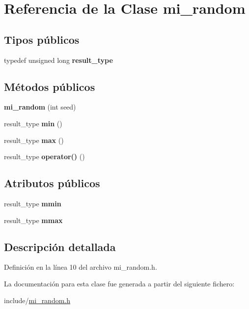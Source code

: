 \hypertarget{classmi__random}{}\section{Referencia de la Clase mi\+\_\+random}
\label{classmi__random}
\subsection*{Tipos públicos}
\begin{DoxyCompactItemize}
\item 
\mbox{\label{classmi__random_a6aea707ebdebf4c974b66185d72d4a1c}} 
typedef unsigned long {\bfseries result\+\_\+type}
\end{DoxyCompactItemize}
\subsection*{Métodos públicos}
\begin{DoxyCompactItemize}
\item 
\mbox{\label{classmi__random_ab570501afcf32838a6a7d37a36e542ce}} 
{\bfseries mi\+\_\+random} (int seed)
\item 
\mbox{\label{classmi__random_ad5424670d2a746b4712e16ed33e2f1eb}} 
result\+\_\+type {\bfseries min} ()
\item 
\mbox{\label{classmi__random_a93a965b26278493733341309a81d654b}} 
result\+\_\+type {\bfseries max} ()
\item 
\mbox{\label{classmi__random_ad65d42c8086c561fbe7e9a392295345d}} 
result\+\_\+type {\bfseries operator()} ()
\end{DoxyCompactItemize}
\subsection*{Atributos públicos}
\begin{DoxyCompactItemize}
\item 
\mbox{\label{classmi__random_ae98232ccc182fa396e63843c3a5aa739}} 
result\+\_\+type {\bfseries mmin}
\item 
\mbox{\label{classmi__random_a8f5e124381a63054923d5c7bd7253058}} 
result\+\_\+type {\bfseries mmax}
\end{DoxyCompactItemize}


\subsection{Descripción detallada}


Definición en la línea 10 del archivo mi\+\_\+random.\+h.



La documentación para esta clase fue generada a partir del siguiente fichero\+:\begin{DoxyCompactItemize}
\item 
include/\hyperlink{mi__random_8h}{mi\+\_\+random.\+h}\end{DoxyCompactItemize}
